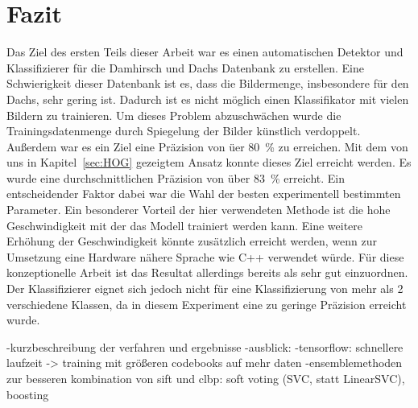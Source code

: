 \section{Fazit}
\label{sec:fazit}
Das Ziel des ersten Teils dieser Arbeit war es einen automatischen Detektor und Klassifizierer für die Damhirsch und Dachs Datenbank zu erstellen. Eine Schwierigkeit dieser Datenbank ist es, dass die Bildermenge, insbesondere für den Dachs, sehr gering ist. Dadurch ist es nicht möglich einen Klassifikator mit vielen Bildern zu trainieren. Um dieses Problem abzuschwächen wurde die Trainingsdatenmenge durch Spiegelung der Bilder künstlich verdoppelt. Außerdem war es ein Ziel eine Präzision von üer 80~\% zu erreichen. Mit dem von uns in Kapitel~\ref{sec:HOG} gezeigtem Ansatz konnte dieses Ziel erreicht werden. Es wurde eine durchschnittlichen Präzision von über 83~\% erreicht. Ein entscheidender Faktor dabei war die Wahl der besten experimentell bestimmten Parameter. Ein besonderer Vorteil der hier verwendeten Methode ist die hohe Geschwindigkeit mit der das Modell trainiert werden kann. Eine weitere Erhöhung der Geschwindigkeit könnte zusätzlich erreicht werden, wenn zur Umsetzung eine Hardware nähere Sprache wie C++ verwendet würde. Für diese konzeptionelle Arbeit ist das Resultat allerdings bereits als sehr gut einzuordnen. Der Klassifizierer eignet sich jedoch nicht für eine Klassifizierung von mehr als 2 verschiedene Klassen, da in diesem Experiment eine zu geringe Präzision erreicht wurde. 

-kurzbeschreibung der verfahren und ergebnisse
-ausblick:
	-tensorflow: schnellere laufzeit -> training mit größeren codebooks auf mehr daten
	-ensemblemethoden zur besseren kombination von sift und clbp: soft voting (SVC, statt LinearSVC), boosting